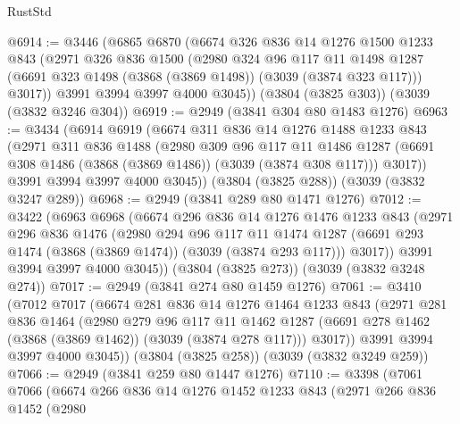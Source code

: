 \begin{lexlean}{RustStd}
\begin{coremodule}
@6914 := @3446
    (@6865
      @6870
      (@6674
        @326
        @836
        @14
        @1276
        @1500
        @1233
        @843
        (@2971
          @326
          @836
          @1500
          (@2980
            @324
            @96
            @117
            @11
            @1498
            @1287
            (@6691 @323 @1498 (@3868 (@3869 @1498)) (@3039 (@3874 @323 @117)))
            @3017))
        @3991
        @3994
        @3997
        @4000
        @3045))
    (@3804 (@3825 @303))
    (@3039 (@3832 @3246 @304))
@6919 := @2949 (@3841 @304 @80 @1483 @1276)
@6963 := @3434
    (@6914
      @6919
      (@6674
        @311
        @836
        @14
        @1276
        @1488
        @1233
        @843
        (@2971
          @311
          @836
          @1488
          (@2980
            @309
            @96
            @117
            @11
            @1486
            @1287
            (@6691 @308 @1486 (@3868 (@3869 @1486)) (@3039 (@3874 @308 @117)))
            @3017))
        @3991
        @3994
        @3997
        @4000
        @3045))
    (@3804 (@3825 @288))
    (@3039 (@3832 @3247 @289))
@6968 := @2949 (@3841 @289 @80 @1471 @1276)
@7012 := @3422
    (@6963
      @6968
      (@6674
        @296
        @836
        @14
        @1276
        @1476
        @1233
        @843
        (@2971
          @296
          @836
          @1476
          (@2980
            @294
            @96
            @117
            @11
            @1474
            @1287
            (@6691 @293 @1474 (@3868 (@3869 @1474)) (@3039 (@3874 @293 @117)))
            @3017))
        @3991
        @3994
        @3997
        @4000
        @3045))
    (@3804 (@3825 @273))
    (@3039 (@3832 @3248 @274))
@7017 := @2949 (@3841 @274 @80 @1459 @1276)
@7061 := @3410
    (@7012
      @7017
      (@6674
        @281
        @836
        @14
        @1276
        @1464
        @1233
        @843
        (@2971
          @281
          @836
          @1464
          (@2980
            @279
            @96
            @117
            @11
            @1462
            @1287
            (@6691 @278 @1462 (@3868 (@3869 @1462)) (@3039 (@3874 @278 @117)))
            @3017))
        @3991
        @3994
        @3997
        @4000
        @3045))
    (@3804 (@3825 @258))
    (@3039 (@3832 @3249 @259))
@7066 := @2949 (@3841 @259 @80 @1447 @1276)
@7110 := @3398
    (@7061
      @7066
      (@6674
        @266
        @836
        @14
        @1276
        @1452
        @1233
        @843
        (@2971
          @266
          @836
          @1452
          (@2980

\end{coremodule}
\end{lexlean}
